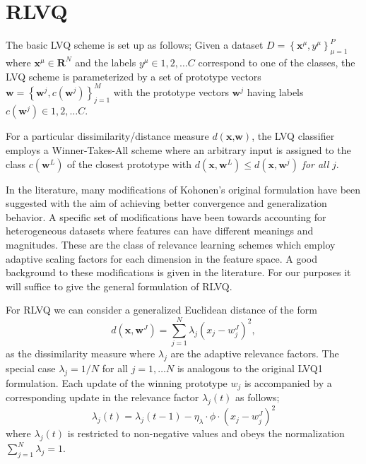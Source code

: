 \documentclass{esannV2}
\begin{document}
\section{RLVQ}
\label{sec:RLVQ}

The basic LVQ scheme is set up as follows; Given a dataset $D = \left\{\textbf{x}^\mu, y^\mu\right\}^P_{\mu = 1}$ where $\textbf{x}^\mu \in \textbf{R}^N$ and the labels $y^\mu \in {1,2,\ldots C}$ correspond to one of the classes, the LVQ scheme is parameterized by a set of prototype vectors $\textbf{w} = \left\{\textbf{w}^j, c(\textbf{w}^j)\right\}^M_{j=1}$ with the prototype vectors $\textbf{w}^j$ having labels $c(\textbf{w}^j) \in {1,2,\dots C}$.

For a particular dissimilarity/distance measure $d(\textbf{x,w})$, the LVQ classifier employs a Winner-Takes-All scheme where an arbitrary input is assigned to the class $c(\textbf{w}^L)$ of the closest prototype with $d(\textbf{x},\textbf{w}^L) \leq d(\textbf{x},\textbf{w}^j)$ \textsl{for all} $j$.

In the literature, many modifications of Kohonen's original formulation\cite{02} have been suggested with the aim of achieving better convergence and generalization behavior. A specific set of modifications have been towards accounting for heterogeneous datasets where features can have different meanings and magnitudes. These are the class of relevance learning schemes which employ adaptive scaling factors for each dimension in the feature space. A good background to these modifications is given in the literature\cite{09,10,11}. For our purposes it will suffice to give the general formulation of RLVQ.

For RLVQ we can consider a generalized Euclidean distance of the form
%
\begin{equation} 
d(\textbf{x},\textbf{w}^J) = \sum^N_{j=1} \lambda_j (x_j - w^J_j)^2 ,
\end{equation}
%
\noindent
as the dissimilarity measure where $\lambda_j$ are the adaptive relevance factors. The special case $\lambda_j = 1/N$ for all $j = 1,\ldots N$ is analogous to the original LVQ1 formulation. Each update of the winning prototype $w_j$ is accompanied by a corresponding update in the relevance factor $\lambda_j(t)$ as follows;
%
\begin{equation}
\lambda_j(t) = \lambda_j(t-1) - \eta_\lambda \cdot \phi \cdot (x_j - w^J_j)^2 
\end{equation}
%
\noindent
where $\lambda_j(t)$ is restricted to non-negative values and obeys the normalization $\sum^N_{j=1} \lambda_j = 1$.
\end{document}
